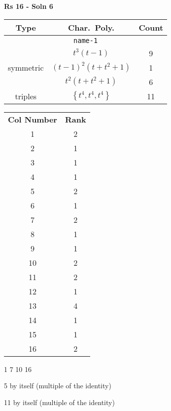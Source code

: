 \documentclass{article}
\begin{document}
    \textbf{Rs 16 - Soln 6}
    \begin{table}
    \begin{tabular}{|c|c|c|}
    \hline
    \textbf{Type} & \textbf{Char.~Poly.} & \textbf{Count} \\
    \hline \multicolumn{3}{|c|}{\texttt{name-1}} \\ \hline
    \multirow{3}{*}{symmetric}
    & $t^3(t - 1)$ & 9 \\
    & $(t - 1)^2(t + t^2 + 1)$ & 1 \\
    & $t^2(t + t^2 + 1)$ & 6 \\
    \hline
    \multirow{1}{*}{triples}
    & $\left\{t^4,t^4,t^4\right\}$ & 11 \\
    \hline
    \end{tabular}
    \end{table}
    \begin{table}
    \begin{tabular}{|c|c|}
    \hline
    \textbf{Col Number} & \textbf{Rank}\\
    1 & 2 \\ 
    2 & 1 \\ 
    3 & 1 \\ 
    4 & 1 \\ 
    5 & 2 \\ 
    6 & 1 \\ 
    7 & 2 \\ 
    8 & 1 \\ 
    9 & 1 \\ 
    10 & 2 \\ 
    11 & 2 \\ 
    12 & 1 \\ 
    13 & 4 \\ 
    14 & 1 \\ 
    15 & 1 \\ 
    16 & 2 \\ 
    \hline
    \end{tabular}
    \end{table}

    1 7 10 16

    5 by itself (multiple of the identity)

    11 by itself (multiple of the identity)
    \newpage
\end{document}
